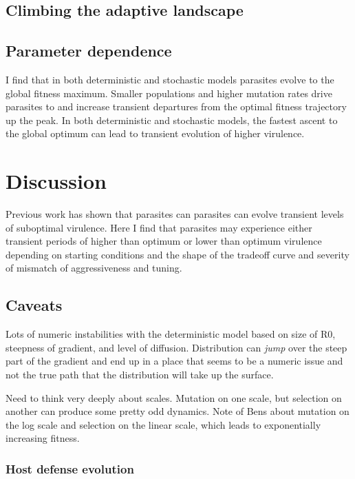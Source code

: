 \subsection*{Climbing the adaptive landscape}

\subsection*{Parameter dependence}

I find that in both deterministic and stochastic models parasites evolve to the global fitness maximum. Smaller populations and higher mutation rates drive parasites to and increase transient departures from the optimal fitness trajectory up the peak. In both deterministic and stochastic models, the fastest ascent to the global optimum can lead to transient evolution of higher virulence.

\section*{Discussion}

Previous work has shown that parasites can parasites can evolve transient levels of suboptimal virulence. Here I find that parasites may experience either transient periods of higher than optimum or lower than optimum virulence depending on starting conditions and the shape of the tradeoff curve and severity of mismatch of aggressiveness and tuning.

\subsection*{Caveats}

Lots of numeric instabilities with the deterministic model based on size of R0, steepness of gradient, and level of diffusion. Distribution can \emph{jump} over the steep part of the gradient and end up in a place that seems to be a numeric issue and not the true path that the distribution will take up the surface.

Need to think very deeply about scales. Mutation on one scale, but selection on another can produce some pretty odd dynamics. Note of Bens about mutation on the log scale and selection on the linear scale, which leads to exponentially increasing fitness.

\subsubsection*{Host defense evolution}

